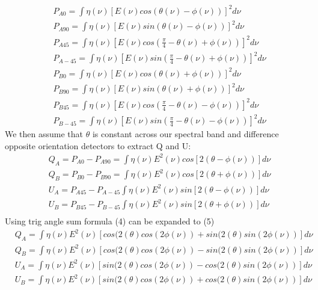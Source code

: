 \begin{equation}
\begin{split}
&P_{A0} = \int \eta(\nu)[E(\nu)cos(\theta(\nu)-\phi(\nu))]^2 d\nu \\
&P_{A90} = \int \eta(\nu)[E(\nu)sin(\theta(\nu)-\phi(\nu))]^2 d\nu \\
&P_{A45} = \int \eta(\nu)[E(\nu)cos(\frac{\pi}{4}-\theta(\nu)+\phi(\nu))]^2 d\nu \\
&P_{A-45} = \int \eta(\nu)[E(\nu)sin(\frac{\pi}{4}-\theta(\nu)+\phi(\nu))]^2 d\nu \\
&P_{B0} = \int \eta(\nu)[E(\nu)cos(\theta(\nu)+\phi(\nu))]^2 d\nu \\
&P_{B90} = \int \eta(\nu)[E(\nu)sin(\theta(\nu)+\phi(\nu))]^2 d\nu \\
&P_{B45} = \int \eta(\nu)[E(\nu)cos(\frac{\pi}{4}-\theta(\nu)-\phi(\nu))]^2 d\nu \\
&P_{B-45} = \int \eta(\nu)[E(\nu)sin(\frac{\pi}{4}-\theta(\nu)-\phi(\nu))]^2 d\nu
\end{split}
\end{equation}
We then assume that $\theta$ is constant across our spectral band and difference opposite orientation detectors to extract Q and U:
\begin{equation}
\begin{split}
&Q_A= P_{A0}-P_{A90}=\int \eta(\nu)E^2(\nu)cos[2(\theta-\phi(\nu))]d\nu \\
&Q_B = P_{B0}-P_{B90}=\int \eta(\nu)E^2(\nu)cos[2(\theta+\phi(\nu))] d\nu \\
&U_A = P_{A45}-P_{A-45}\int \eta(\nu)E^2(\nu)sin[2(\theta-\phi(\nu))] d\nu \\
&U_B =  P_{B45}-P_{B-45}\int \eta(\nu)E^2(\nu)sin[2(\theta+\phi(\nu))] d\nu \\
\end{split}
\end{equation}
Using trig angle sum formula (4) can be expanded to (5) 
\begin{equation}
\begin{split}
&Q_A= \int \eta(\nu)E^2(\nu)[cos(2(\theta)cos(2\phi(\nu))+sin(2(\theta)sin(2\phi(\nu))]d\nu \\
&Q_B = \int \eta(\nu)E^2(\nu)[cos(2(\theta)cos(2\phi(\nu))-sin(2(\theta)sin(2\phi(\nu))]d\nu \\
&U_A = \int \eta(\nu)E^2(\nu)[sin(2(\theta)cos(2\phi(\nu))-cos(2(\theta)sin(2\phi(\nu))]d\nu \\
&U_B =  \int \eta(\nu)E^2(\nu)[sin(2(\theta)cos(2\phi(\nu))+cos(2(\theta)sin(2\phi(\nu))]d\nu \\
\end{split}
\end{equation}
